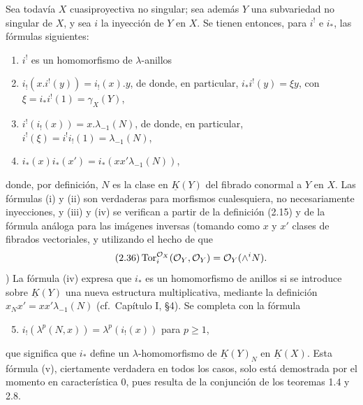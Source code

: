 Sea todavía $X$ cuasiproyectiva no singular; sea además $Y$ una subvariedad no singular de $X$, y sea $i$ la inyección de $Y$ en $X$. Se tienen entonces, para $i^!$ e $i_*$, las fórmulas siguientes:
\begin{enumerate}[label=(\roman*)]
\item $i^!$ es un homomorfismo de $\lambda$-anillos
\item $i_!(x.i^!(y))=i_!(x).y$, de donde, en particular, $i_*i^!(y)=\xi y$, con $\xi=i_*i^!(1)=\gamma_X(Y)$,
\item $i^!(i_!(x))=x.\lambda_{-1}(N)$, de donde, en particular, $i^!(\xi)=i^!i_!(1)=\lambda_{-1}(N)$,
\item $i_*(x)i_*(x')=i_*(xx'\lambda_{-1}(N))$,
\end{enumerate}
donde, por definición, $N$ es la clase en $\underline K(Y)$ del fibrado conormal a $Y$ en $X$. Las fórmulas (i) y (ii) son verdaderas para morfismos cualesquiera, no necesariamente inyecciones, y (iii) y (iv) se verifican a partir de la definición (2.15) y de la fórmula análoga para las imágenes inversas (tomando como $x$ y $x'$ clases de fibrados vectoriales, y utilizando el hecho de que
\begin{equation}\tag{2.36}
 \operatorname{Tor}^{\mathcal O_X}_i(\mathcal O_Y,\mathcal O_Y)=\mathcal O_Y(\wedge^i N).
\end{equation}
)
La fórmula (iv) expresa que $i_*$ es un homomorfismo de anillos si se introduce sobre $\underline K(Y)$ una nueva estructura multiplicativa, mediante la definición $x_N x'=xx'\lambda_{-1}(N)$ (cf.\ Capítulo I, \S 4). Se completa con la fórmula
\begin{enumerate}[label=(\roman*)]
\setcounter{enumi}{4}
\item $i_!(\lambda^p(N,x))=\lambda^p(i_!(x))$ para $p\geq1$,
\end{enumerate}
que significa que $i_*$ define un $\lambda$-homomorfismo de $\underline K(Y)_N$ en $\underline K(X)$. Esta fórmula (v), ciertamente verdadera en todos los casos, solo está demostrada por el momento en característica $0$, pues resulta de la conjunción de los teoremas 1.4 y 2.8.

